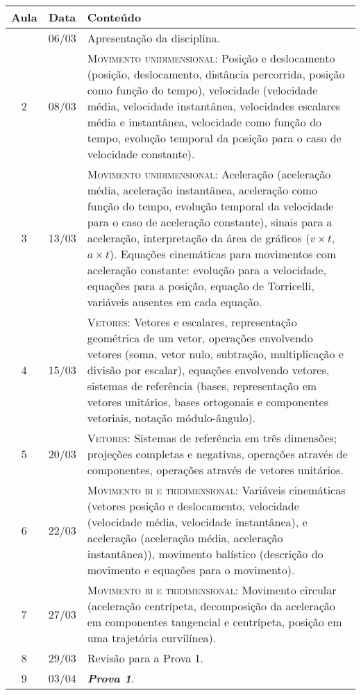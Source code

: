 \begin{center}
\begin{longtable}{ccp{70mm}}
\toprule
Aula & Data & Conteúdo \\
\midrule
\endhead
\bottomrule
\endfoot
1	 & 	06/03	 & 	Apresentação da disciplina. \\
2	 & 	08/03	 & 	\textsc{Movimento unidimensional:} Posição e deslocamento (posição, deslocamento, distância percorrida, posição como função do tempo), velocidade (velocidade média, velocidade instantânea, velocidades escalares média e instantânea, velocidade como função do tempo, evolução temporal da posição para o caso de velocidade constante). \\
3	 & 	13/03	 & 	\textsc{Movimento unidimensional:} Aceleração (aceleração média, aceleração instantânea, aceleração como função do tempo, evolução temporal da velocidade para o caso de aceleração constante), sinais para a aceleração, interpretação da área de gráficos ($v \times t$, $a \times  t$). Equações cinemáticas para movimentos com aceleração constante: evolução para a velocidade, equações para a posição, equação de Torricelli, variáveis ausentes em cada equação. \\
4	 & 	15/03	 & 	\textsc{Vetores:} Vetores e escalares, representação geométrica de um vetor, operações envolvendo vetores (soma, vetor nulo, subtração, multiplicação e divisão por escalar), equações envolvendo vetores, sistemas de referência (bases, representação em vetores unitários, bases ortogonais e componentes vetoriais, notação módulo-ângulo). \\
5	 & 	20/03	 &  \textsc{Vetores:} Sistemas de referência em três dimensões; projeções completas e negativas, operações através de componentes, operações através de vetores unitários. \\
6	 & 	22/03	 & 	\textsc{Movimento bi e tridimensional:} Variáveis cinemáticas (vetores posição e deslocamento, velocidade (velocidade média, velocidade instantânea), e aceleração (aceleração média, aceleração instantânea)), movimento balístico (descrição do movimento e equações para o movimento). \\
7	 & 	27/03	 & 	\textsc{Movimento bi e tridimensional:} Movimento circular (aceleração centrípeta, decomposição da aceleração em componentes tangencial e centrípeta, posição em uma trajetória curvilínea). \\
8	 & 	29/03	 & 	Revisão para a Prova 1. \\
9	 & 	03/04	 & 	\textbf{\textit{Prova 1}}. \\

\end{longtable}
\end{center}
